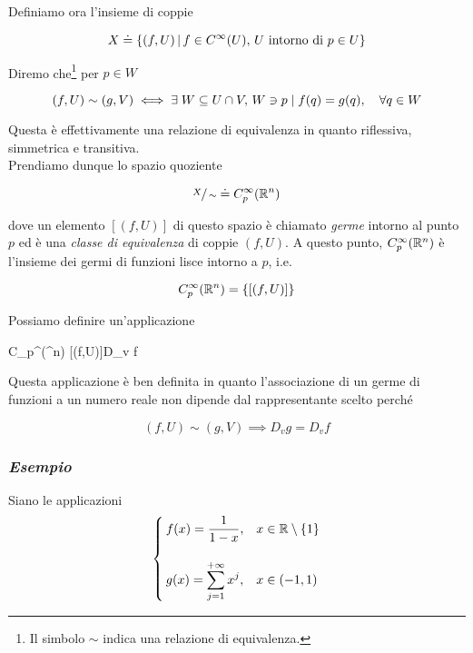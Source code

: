 Definiamo ora l'insieme di coppie

\begin{equation}
	X \doteq \left\{ (f,U) \, \middle| \, f \in C^{\infty}(U), \, U \text{ intorno di } p \in U \right\}
\end{equation}

Diremo che\footnote{%
	Il simbolo $ \sim $ indica una relazione di equivalenza.%
} per $ p \in W $

\begin{equation}
	(f,U) \sim (g,V) \iff \E W \subseteq U \cap V, \, W \ni p \mid f(q) = g(q) \qcomma \forall q \in W
\end{equation}

Questa è effettivamente una relazione di equivalenza in quanto riflessiva, simmetrica e transitiva.\\
Prendiamo dunque lo spazio quoziente

\begin{equation}
	\sfrac{X}{\sim} \doteq C_{p}^{\infty}(\mathbb{R}^{n})
\end{equation}

dove un elemento $ [(f,U)] $ di questo spazio è chiamato \textit{germe} intorno al punto $ p $ ed è una \textit{classe di equivalenza} di coppie $ (f,U) $. A questo punto, $ C_{p}^{\infty}(\mathbb{R}^{n}) $ è l'insieme dei germi di funzioni lisce intorno a $ p $, i.e.

\begin{equation}
	C_{p}^{\infty}(\mathbb{R}^{n}) = \left\{ [(f,U)] \right\}
\end{equation} 

Possiamo definire un'applicazione

%
	{C_{p}^{\infty}(\R^{n})}{\R}%
	{[(f,U)]}{D_{v} f}

Questa applicazione è ben definita in quanto l'associazione di un germe di funzioni a un numero reale non dipende dal rappresentante scelto perché

\begin{equation}
	(f,U) \sim (g,V) \implies D_{v} g = D_{v} f
\end{equation}

\subsubsection{\textit{Esempio}}

Siano le applicazioni
\begin{equation}
	\begin{cases}
		f(x) = \dfrac{1}{1-x}, & x \in \mathbb{R} \setminus \{1\}\\\\
		g(x) = \displaystyle\sum_{j=1}^{+\infty} x^{j}, & x \in (-1,1)
	\end{cases}
\end{equation}

